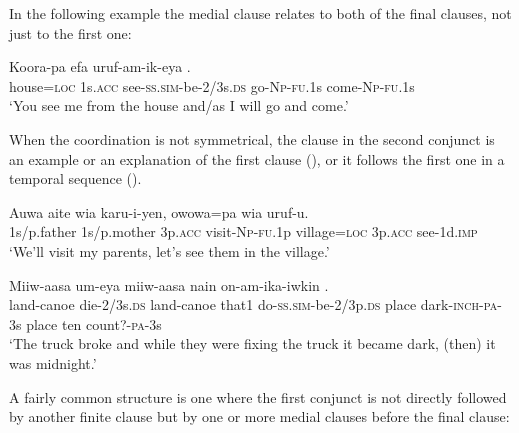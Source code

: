 In the following example the medial clause relates to both of the final clauses, not just to the first one:

\ea%
\label{ex:x1851}
\gll Koora-pa  efa  uruf-am-ik-eya  \textstyleEmphasizedVernacularWords{-}\textstyleEmphasizedVernacularWords{-} \textstyleEmphasizedVernacularWords{-}\textstyleEmphasizedVernacularWords{-}.\\
house=\textsc{loc}  1s.\textsc{acc}  see-\textsc{ss}.\textsc{sim}-be-2/3s.\textsc{ds}  go-\textsc{Np}-\textsc{fu}.1s come-\textsc{Np}-\textsc{fu}.1s\\
\glt `You see me from the house and/as I will go and come.'
\z
{}

When the coordination is not symmetrical, the clause in the second conjunct is an example or an explanation of the first clause (), or it follows the first one in a temporal sequence ().

\ea%
\label{ex:x1370}
\gll Auwa  aite  wia  karu-i-yen,  owowa=pa wia  uruf-u.\\
1s/p.father  1s/p.mother  3p.\textsc{acc}  visit-\textsc{Np}-\textsc{fu}.1p  village=\textsc{loc} 3p.\textsc{acc}  see-1d.\textsc{imp}\\
\glt `We'll visit my parents, let's see them in the village.'
\z


\ea%
\label{ex:x1369}
\gll Miiw-aasa  um-eya  miiw-aasa  nain  on-am-ika-iwkin          .
\\
land-canoe  die-2/3s.\textsc{ds}  land-canoe  that1  do-\textsc{ss}.\textsc{sim}-be-2/3p.\textsc{ds}      place  dark-\textsc{inch}-\textsc{pa}-3s  place  ten  count?-\textsc{pa}-3s\\
\glt `The truck broke and while they were fixing the truck it became dark, (then) it was midnight.'
\z

A fairly common structure is one where the first conjunct is not directly followed by another finite clause but by one or more medial clauses before the final clause:

